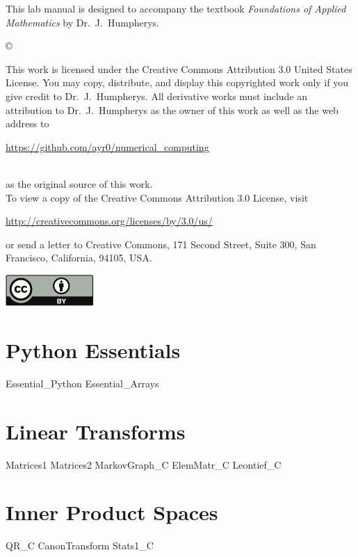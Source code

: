 \documentclass{newsiambook}
\begin{document}
\begin{thepreface}
This lab manual is designed to accompany the textbook \emph{Foundations of Applied Mathematics} by Dr.~J.~Humpherys.

\vfill
\copyright{This work is licensed under the Creative Commons Attribution 3.0 United States 
License.  You may copy, distribute, and display this copyrighted work only if you give 
credit to Dr.~J.~Humpherys. All derivative works must include an attribution to Dr.~J.~Humpherys as the owner of this work as well as the web address to 
\\\centerline{\url{https://github.com/ayr0/numerical_computing}}\\ as the original source of 
this 
work.\\To view a copy of the Creative Commons Attribution 3.0 License, 
visit\\\centerline{\url{http://creativecommons.org/licenses/by/3.0/us/}} or send a letter to 
Creative Commons, 171 Second Street, Suite 300, San Francisco, California, 94105, USA.}

\vfill
\centering\includegraphics[height=1.2cm]{by}
\vfill
\end{thepreface}

\setcounter{tocdepth}{1}
\tableofcontents

\mainmatter


\part{Python Essentials}
{Essential_Python}
{Essential_Arrays}

\part{\large Linear Transforms}
{Matrices1}
{Matrices2}
{MarkovGraph_C}
{ElemMatr_C}
{Leontief_C}

\part{Inner Product Spaces}
{QR_C}
{CanonTransform} 
{Stats1_C}
\end{document}

